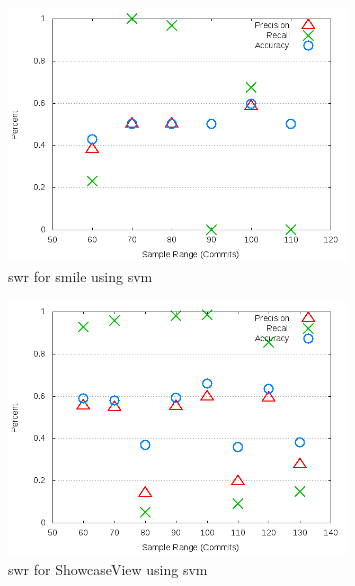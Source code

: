 \begin{figure}[!t]
\centering
\includegraphics[width=0.8\textwidth]{images/svm/test_1/smile_sample_range.png}
\caption{\gls{swr} for smile using \gls{svm}}
\label{fig:test_1_smile_svm}
\end{figure}

\begin{figure}[!t]
\centering
\includegraphics[width=0.8\textwidth]{images/svm/test_1/ShowcaseView_sample_range.png}
\caption{\gls{swr} for ShowcaseView using \gls{svm}}
\label{fig:test_1_ShowcaseView_svm}
\end{figure}

